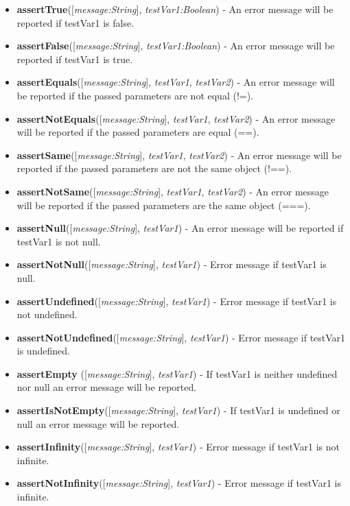 \begin{itemize}
	\item \textbf{assertTrue}([\textit{message:String}], \textit{testVar1:Boolean}) - An error message will be reported if testVar1 is false.
	\item \textbf{assertFalse}([\textit{message:String}],\textit{ testVar1:Boolean}) - An error message will be reported if testVar1 is true.
	\item \textbf{assertEquals}([\textit{message:String}], \textit{testVar1}, \textit{testVar2}) - An error message will be reported if the passed parameters are not equal (!=).
	\item \textbf{assertNotEquals}([\textit{message:String}], \textit{testVar1}, \textit{testVar2}) - An error message will be reported if the passed parameters are equal (==).
	\item \textbf{assertSame}([\textit{message:String}], \textit{testVar1}, \textit{testVar2}) - An error message will be reported if the passed parameters are not the same object (!==).
	\item \textbf{assertNotSame}([\textit{message:String}], \textit{testVar1}, \textit{testVar2}) - An error message will be reported if the passed parameters are the same object (===).
	\item \textbf{assertNull}([\textit{message:String}], \textit{testVar1}) - An error message will be reported if testVar1 is not null.
	\item \textbf{assertNotNull}([\textit{message:String}], \textit{testVar1}) - Error message if testVar1 is null.
	\item \textbf{assertUndefined}([\textit{message:String}], \textit{testVar1}) - Error message if testVar1 is not undefined.
	\item \textbf{assertNotUndefined}([\textit{message:String}], \textit{testVar1}) - Error message if testVar1 is undefined.
	\item \textbf{assertEmpty }([\textit{message:String}], \textit{testVar1}) - If testVar1 is neither undefined nor null an error message will be reported.
	\item \textbf{assertIsNotEmpty}([\textit{message:String}], \textit{testVar1}) - If testVar1 is undefined or null an error message will be reported.
	\item \textbf{assertInfinity}([\textit{message:String}], \textit{testVar1}) - Error message if testVar1 is not infinite.
	\item \textbf{assertNotInfinity}([\textit{message:String}], \textit{testVar1}) - Error message if testVar1 is infinite.

\end{itemize}
